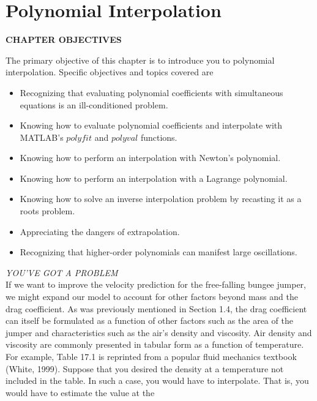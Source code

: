 \documentclass[../main.tex]{subfiles}
\begin{document}
\chapter{Polynomial Interpolation}\label{chap:chap17}

\begin{center}
    \Large{\textbf{CHAPTER OBJECTIVES}}
\end{center}
The primary objective of this chapter is to introduce you to polynomial interpolation.
Specific objectives and topics covered are

\begin{itemize}
    \item Recognizing that evaluating polynomial coefficients with simultaneous equations
    is an ill-conditioned problem.
    \item Knowing how to evaluate polynomial coefficients and interpolate with
    MATLAB's $polyfit$ and $polyval$ functions.
    \item Knowing how to perform an interpolation with Newton's polynomial.
    \item Knowing how to perform an interpolation with a Lagrange polynomial.
    \item Knowing how to solve an inverse interpolation problem by recasting it as a roots
    problem.
    \item Appreciating the dangers of extrapolation.
    \item Recognizing that higher-order polynomials can manifest large oscillations.
\end{itemize}

\noindent\textit{YOU'VE GOT A PROBLEM}\\
If we want to improve the velocity prediction for the free-falling bungee jumper, we might
expand our model to account for other factors beyond mass and the drag coefficient. As
was previously mentioned in Section 1.4, the drag coefficient can itself be formulated as
a function of other factors such as the area of the jumper and characteristics such as the
air's density and viscosity.
Air density and viscosity are commonly presented in tabular form as a function of
temperature. For example, Table 17.1 is reprinted from a popular fluid mechanics textbook
(White, 1999).
Suppose that you desired the density at a temperature not included in the table. In such
a case, you would have to interpolate. That is, you would have to estimate the value at the
\end{document}
